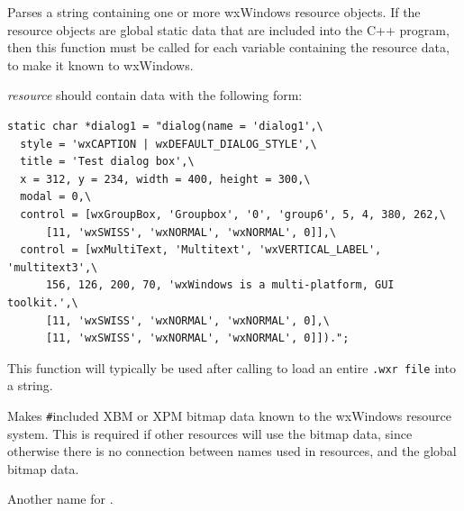 
Parses a string containing one or more wxWindows resource objects. If
the resource objects are global static data that are included into the
C++ program, then this function must be called for each variable
containing the resource data, to make it known to wxWindows.

{\it resource} should contain data with the following form:

\begin{verbatim}
static char *dialog1 = "dialog(name = 'dialog1',\
  style = 'wxCAPTION | wxDEFAULT_DIALOG_STYLE',\
  title = 'Test dialog box',\
  x = 312, y = 234, width = 400, height = 300,\
  modal = 0,\
  control = [wxGroupBox, 'Groupbox', '0', 'group6', 5, 4, 380, 262,\
      [11, 'wxSWISS', 'wxNORMAL', 'wxNORMAL', 0]],\
  control = [wxMultiText, 'Multitext', 'wxVERTICAL_LABEL', 'multitext3',\
      156, 126, 200, 70, 'wxWindows is a multi-platform, GUI toolkit.',\
      [11, 'wxSWISS', 'wxNORMAL', 'wxNORMAL', 0],\
      [11, 'wxSWISS', 'wxNORMAL', 'wxNORMAL', 0]]).";
\end{verbatim}

This function will typically be used after calling  to
load an entire {\tt .wxr file} into a string.

\membersection{::wxResourceRegisterBitmapData}\label{registerbitmapdata}



Makes \verb$#$included XBM or XPM bitmap data known to the wxWindows resource system. 
This is required if other resources will use the bitmap data, since otherwise there
is no connection between names used in resources, and the global bitmap data.


Another name for .

